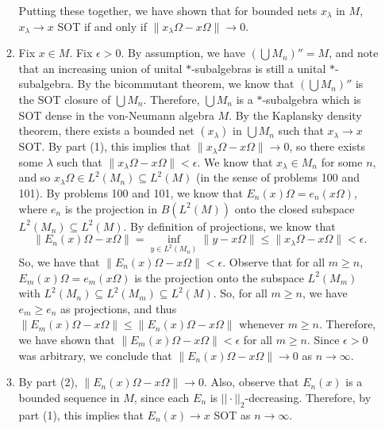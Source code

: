 \documentclass[a4paper,10pt]{report}
\newcommand{\pn}[2]{||#1||_{#2}}
\begin{document}
\begin{enumerate}
\begin{enumerate}
			\newline
			\newline Putting these together, we have shown that for bounded nets $x_\lambda$ in $M$, $x_\lambda \rightarrow x$ SOT if and only if $\|x_\lambda \Omega - x\Omega\| \rightarrow 0$.
			\item Fix $x\in M$.  Fix $\epsilon > 0$.  By assumption, we have $(\bigcup{M_n})'' = M$, and note that an increasing union of unital $*$-subalgebras is still a unital $*$-subalgebra. 
				By the bicommutant theorem, we know that $(\bigcup{M_n})''$ is the SOT closure of $\bigcup{M_n}$.  Therefore, $\bigcup{M_n}$ is a $*$-subalgebra which is SOT dense in the von-Neumann algebra $M$. By the Kaplansky density theorem, there exists a bounded net $(x_\lambda)$ in $\bigcup{M_n}$ such that $x_\lambda \rightarrow x$ SOT.  By part (1), this implies that $\|x_\lambda \Omega - x\Omega\| \rightarrow 0$, so there exists some $\lambda$ such that $\|x_\lambda \Omega - x\Omega\| < \epsilon$.  We know that $x_\lambda \in M_n$ for some $n$, and so $x_\lambda \Omega \in L^2(M_n) \subseteq L^2(M)$ (in the sense of problems 100 and 101).  By problems 100 and 101, we know that $E_n(x)\Omega = e_n (x\Omega)$, where $e_n$ is the projection in $B(L^2(M))$ onto the closed subspace $L^2(M_n)\subseteq L^2(M)$. By definition of projections, we know that $$\|E_n(x)\Omega - x\Omega \| = \inf_{y\in L^2(M_n)}{\|y - x\Omega\|} \leq \|x_\lambda \Omega - x\Omega\| < \epsilon.$$ So, we have that $\|E_n(x)\Omega - x\Omega \| < \epsilon$.  Observe that for all $m\geq n$, $E_m(x)\Omega = e_m(x\Omega)$ is the projection onto the subspace $L^2(M_m)$ with $L^2(M_n)\subseteq L^2(M_m)\subseteq L^2(M)$.  So, for all $m\geq n$, we have $e_m\geq e_n$ as projections, and thus $\|E_m(x)\Omega - x\Omega \| \leq \|E_n(x)\Omega - x\Omega \|$ whenever $m\geq n$.  Therefore, we have shown that $\|E_m(x)\Omega - x\Omega \| < \epsilon$ for all $m\geq n$.  Since $\epsilon > 0$ was arbitrary, we conclude that $\|E_n(x)\Omega - x\Omega\| \rightarrow 0$ as $n\rightarrow \infty$.
			\item By part (2), $\|E_n(x)\Omega - x\Omega\| \rightarrow 0$.  Also, observe that $E_n(x)$ is a bounded sequence in $M$, 
				since each $E_n$ is $\pn{\cdot}{2}$-decreasing. 
				Therefore, by part (1), this implies that $E_n(x) \rightarrow x$ SOT as $n\rightarrow \infty$.
		\end{enumerate}
\end{enumerate}
\end{document}
